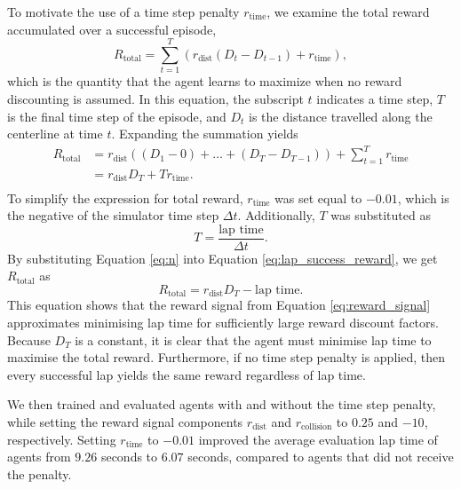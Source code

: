 To motivate the use of a time step penalty $r_{\text{time}}$, we examine the total reward accumulated over a successful episode, 
\begin{equation}
        R_{\text{total}} =  \sum_{t=1}^{T} \left( r_{\text{dist}}(D_{t}-D_{t-1})+r_{\text{time}} \right),
\label{eq:lap_success_reward}
\end{equation}
which is the quantity that the agent learns to maximize when no reward discounting is assumed. 
In this equation, the subscript $t$ indicates a time step, $T$ is the final time step of the episode, and $D_t$ is the distance travelled along the centerline at time $t$.
Expanding the summation yields
\begin{equation}
    \begin{split}
        R_{\text{total}}
        &= r_{\text{dist}} \left( (D_1-0) + \ldots + (D_{T} - D_{T-1}) \right) + \sum_{t=1}^{T} r_{\text{time}} \\
        &= r_{\text{dist}} D_T  + T r_{\text{time}}. \\
    \end{split}
\label{eq:lap_success_reward_1}
\end{equation}
To simplify the expression for total reward, $r_{\text{time}}$ was set equal to $-0.01$, which is the negative of the simulator time step $\Delta t$.
Additionally, $T$ was substituted as
\begin{equation}
T=\frac{\text{lap time}}{\Delta t}.
\label{eq:n}
\end{equation}
By substituting Equation \ref{eq:n} into Equation \ref{eq:lap_success_reward}, we get $R_{\text{total}}$ as
\begin{equation}\label{eq:reward_proof}
    R_{\text{total}} = r_{\text{dist}} D_T - \text{lap time}.
\end{equation}
This equation shows that the reward signal from Equation \ref{eq:reward_signal} approximates minimising lap time for sufficiently large reward discount factors.
Because $D_T$ is a constant, it is clear that the agent must minimise lap time to maximise the total reward.
Furthermore, if no time step penalty is applied, then every successful lap yields the same reward regardless of lap time.

We then trained and evaluated agents with and without the time step penalty, while setting the reward signal components $r_{\text{dist}}$ and $r_{\text{collision}}$ to $0.25$ and $-10$, respectively.
Setting $r_{\text{time}}$ to $-0.01$ improved the average evaluation lap time of agents from $9.26$ seconds to $6.07$ seconds, compared to agents that did not receive the penalty.


